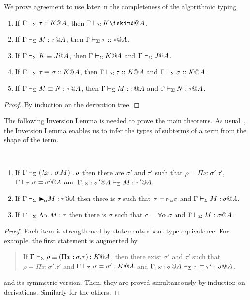 We prove agreement to use later in the completeness of the algorithmic typing.

\begin{lemma}[Agreement]
    \label{lemma:Agreement}
    \begin{enumerate}
        \item If \(\Gamma\vdash_\Sigma \tau::K@A\), then \(\G\V K\iskind@A \).
        \item If \(\G\V M:\tau@A\), then \(\Gamma\vdash_\Sigma \tau::*@A\).
        \item If \(\Gamma\vdash_\Sigma K\equiv J@A\), then \(\Gamma\vdash_\Sigma K @A\) and \(\Gamma\vdash_\Sigma J @A\).
        \item If \(\Gamma\vdash_\Sigma \tau\equiv \sigma :: K@A\), then \(\Gamma\vdash_\Sigma \tau::K@A\) and \(\Gamma\vdash_\Sigma \sigma::K@A\).
        \item If \(\G\V M\E N : \tau@A\), then \(\G\V M:\tau@A\) and \(\G\V N:\tau@A\).
    \end{enumerate}
\end{lemma}
\begin{proof}
    By induction on the derivation tree.
\end{proof}



The following Inversion Lemma is needed to prove the main theorems.  As
usual~\cite{TAPL}, the Inversion Lemma enables us to infer the types of
subterms of a term from the shape of the term.

\begin{lemma}[Inversion]\ 
	\begin{enumerate}
		\item If $\Gamma \vdash_\Sigma (\lambda x:\sigma.M) : \rho$ then there are $\sigma'$ and $\tau'$ such that
		      $\rho = \Pi x:\sigma'.\tau'$, $\Gamma \vdash_\Sigma \sigma \equiv \sigma'@A$ and $\Gamma ,x:\sigma'@A\vdash_\Sigma M:\tau'@A$.
		\item If $\G \V \TB_\alpha M : \tau@A$ then 
		      there is $\sigma$ such that $\tau = {\mathop{\triangleright}}_\alpha \sigma$ and $\G \V M : \sigma@A$.
		  \item If $\Gamma \vdash_\Sigma \Lambda\alpha.M : \tau$ then 
		  there is $\sigma$ such that $\sigma = \forall\alpha.\sigma$ and $\G \V M : \sigma@A$.%
	\end{enumerate}
\end{lemma}

\begin{proof}
  Each item is strengthened by statements about type equivalence.
  For example, the first statement is augmented by
  \begin{quotation}
    If $\Gamma \vdash_\Sigma \rho \equiv (\Pi x:\sigma.\tau) : K @A$, then there exist
    $\sigma'$ and $\tau'$ such that $\rho = \Pi x:\sigma'.\tau'$ and
    $\Gamma \vdash_\Sigma \sigma \equiv \sigma' : K @A$ and
    $\G, x:\sigma@A\V \tau \E \tau' : J @A$.
  \end{quotation}
  and its symmetric version.  Then, they are proved simultaneously by induction on derivations.
  Similarly for the others.
\end{proof}

